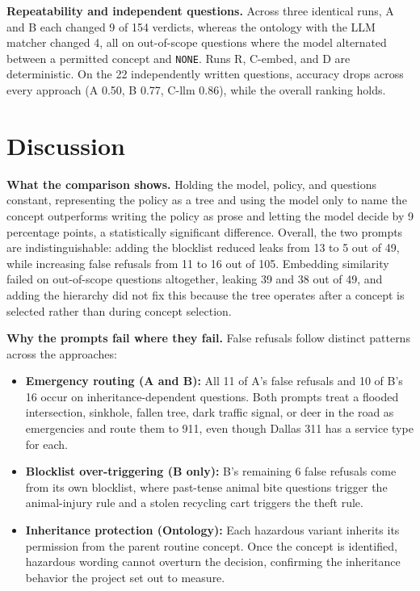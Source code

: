 \documentclass[conference]{IEEEtran}
\begin{document}
\textbf{Repeatability and independent questions.} Across three identical runs, A and B each changed 9 of 154 verdicts, whereas the ontology with the LLM matcher changed 4, all on out-of-scope questions where the model alternated between a permitted concept and \texttt{NONE}. Runs R, C-embed, and D are deterministic. On the 22 independently written questions, accuracy drops across every approach (A 0.50, B 0.77, C-llm 0.86), while the overall ranking holds.

\section{Discussion}

\textbf{What the comparison shows.} Holding the model, policy, and questions constant, representing the policy as a tree and using the model only to name the concept outperforms writing the policy as prose and letting the model decide by 9 percentage points, a statistically significant difference. Overall, the two prompts are indistinguishable: adding the blocklist reduced leaks from 13 to 5 out of 49, while increasing false refusals from 11 to 16 out of 105. Embedding similarity failed on out-of-scope questions altogether, leaking 39 and 38 out of 49, and adding the hierarchy did not fix this because the tree operates after a concept is selected rather than during concept selection.

\textbf{Why the prompts fail where they fail.} False refusals follow distinct patterns across the approaches:
\begin{itemize}
    \item \textbf{Emergency routing (A and B):} All 11 of A's false refusals and 10 of B's 16 occur on inheritance-dependent questions. Both prompts treat a flooded intersection, sinkhole, fallen tree, dark traffic signal, or deer in the road as emergencies and route them to 911, even though Dallas 311 has a service type for each.
    \item \textbf{Blocklist over-triggering (B only):} B's remaining 6 false refusals come from its own blocklist, where past-tense animal bite questions trigger the animal-injury rule and a stolen recycling cart triggers the theft rule.
    \item \textbf{Inheritance protection (Ontology):} Each hazardous variant inherits its permission from the parent routine concept. Once the concept is identified, hazardous wording cannot overturn the decision, confirming the inheritance behavior the project set out to measure.
\end{itemize}
\end{document}
